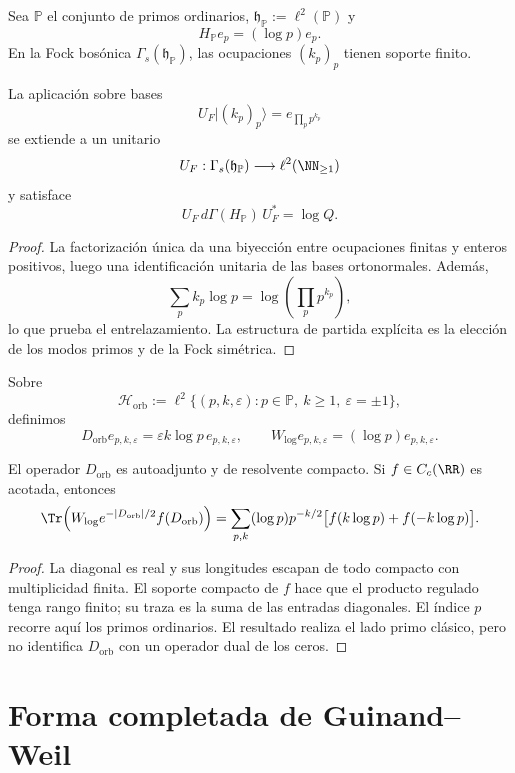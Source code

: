 Sea \(\mathbb P\) el conjunto de primos ordinarios,
\(\mathfrak h_{\mathbb P}:=\ell^2(\mathbb P)\) y
\[
 H_{\mathbb P}e_p=(\log p)e_p.
\]
En la Fock bosónica \(\Gamma_s(\mathfrak h_{\mathbb P})\), las ocupaciones
\((k_p)_p\) tienen soporte finito.

\begin{theorem}
\label{pf84:C08}
La aplicación sobre bases
\[
 U_F\lvert(k_p)_p\rangle=e_{\prod_pp^{k_p}}
\]
se extiende a un unitario
\[
 U_F:\Gamma_s(\mathfrak h_{\mathbb P})
 \longrightarrow\ell^2(\NN_{\ge1})
\]
y satisface
\[
 U_F\,d\Gamma(H_{\mathbb P})\,U_F^*=\log Q.
\]
\end{theorem}

\begin{proof}
La factorización única da una biyección entre ocupaciones finitas y enteros
positivos, luego una identificación unitaria de las bases ortonormales.
Además,
\[
 \sum_pk_p\log p=\log\!\left(\prod_pp^{k_p}\right),
\]
lo que prueba el entrelazamiento. La estructura de partida explícita es la
elección de los modos primos y de la Fock simétrica.
\end{proof}

Sobre
\[
 \mathcal H_{\mathrm{orb}}
 :=\ell^2\{(p,k,\varepsilon):
 p\in\mathbb P,\ k\ge1,\ \varepsilon=\pm1\},
\]
definimos
\[
 D_{\mathrm{orb}}e_{p,k,\varepsilon}
 =\varepsilon k\log p\,e_{p,k,\varepsilon},
 \qquad
 W_{\log}e_{p,k,\varepsilon}
 =(\log p)e_{p,k,\varepsilon}.
\]

\begin{proposition}
\label{pf84:C09}
El operador \(D_{\mathrm{orb}}\) es autoadjunto y de resolvente compacto. Si
\(f\in C_c(\RR)\) es acotada, entonces
\[
 \Tr\!\left(
 W_{\log}e^{-|D_{\mathrm{orb}}|/2}f(D_{\mathrm{orb}})
 \right)
 =
 \sum_{p,k}(\log p)p^{-k/2}
 \bigl[f(k\log p)+f(-k\log p)\bigr].
\]
\end{proposition}

\begin{proof}
La diagonal es real y sus longitudes escapan de todo compacto con
multiplicidad finita. El soporte compacto de \(f\) hace que el producto
regulado tenga rango finito; su traza es la suma de las entradas diagonales.
El índice \(p\) recorre aquí los primos ordinarios. El resultado realiza el
lado primo clásico, pero no identifica \(D_{\mathrm{orb}}\) con un operador
dual de los ceros.
\end{proof}

\section{Forma completada de Guinand--Weil}

